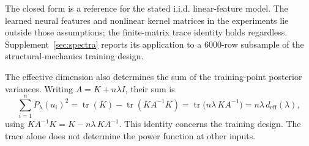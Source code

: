The closed form is a reference for the stated i.i.d. linear-feature model.
The learned neural features and nonlinear kernel matrices in the experiments
lie outside those assumptions; the finite-matrix trace identity holds
regardless. Supplement~\ref{sec:spectra} reports its application to a
$6000$-row subsample of the structural-mechanics training design.

The effective dimension also determines the sum of the training-point
posterior variances. Writing $A=K+n\lambda I$, their sum is
\[
\sum_{i=1}^{n}P_\lambda(u_i)^2
=\operatorname{tr}(K)-\operatorname{tr}(K A^{-1}K)
=\operatorname{tr}\!\big(n\lambda\,KA^{-1}\big)
=n\lambda\,d_{\mathrm{eff}}(\lambda),
\]
using $KA^{-1}K=K-n\lambda\,KA^{-1}$. This identity concerns the training
design. The trace alone does not determine the power function at other inputs.
